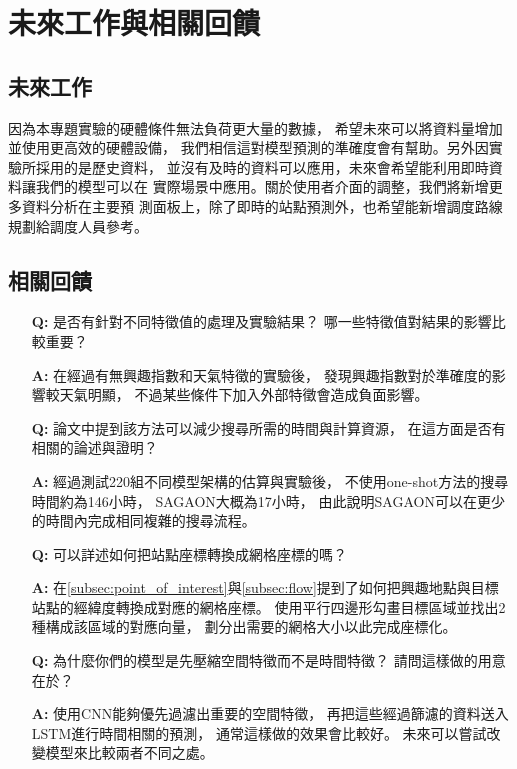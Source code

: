 \documentclass[a4paper,14pt]{extarticle}
\begin{document}
    \newpage
    \section{未來工作與相關回饋}
        \subsection{未來工作}
        因為本專題實驗的硬體條件無法負荷更大量的數據，
        希望未來可以將資料量增加並使用更高效的硬體設備，
        我們相信這對模型預測的準確度會有幫助。另外因實驗所採用的是歷史資料，
        並沒有及時的資料可以應用，未來會希望能利用即時資料讓我們的模型可以在
        實際場景中應用。關於使用者介面的調整，我們將新增更多資料分析在主要預
        測面板上，除了即時的站點預測外，也希望能新增調度路線規劃給調度人員參考。
        \subsection{相關回饋}
            \begin{itemize}
                \item [\textbf{Q:}]
                是否有針對不同特徵值的處理及實驗結果？
                哪一些特徵值對結果的影響比較重要？
                \item [\textbf{A:}]
                在經過有無興趣指數和天氣特徵的實驗後，
                發現興趣指數對於準確度的影響較天氣明顯，
                不過某些條件下加入外部特徵會造成負面影響。
                \item [\textbf{Q:}]
                論文中提到該方法可以減少搜尋所需的時間與計算資源，
                在這方面是否有相關的論述與證明？
                \item [\textbf{A:}]
                經過測試220組不同模型架構的估算與實驗後，
                不使用one-shot方法的搜尋時間約為146小時，
                SAGAON大概為17小時，
                由此說明SAGAON可以在更少的時間內完成相同複雜的搜尋流程。
                \item [\textbf{Q:}]
                可以詳述如何把站點座標轉換成網格座標的嗎？
                \item [\textbf{A:}]
                在\ref{subsec:point_of_interest}與\ref{subsec:flow}提到了如何把興趣地點與目標站點的經緯度轉換成對應的網格座標。
                使用平行四邊形勾畫目標區域並找出2種構成該區域的對應向量，
                劃分出需要的網格大小以此完成座標化。
                \item [\textbf{Q:}]
                為什麼你們的模型是先壓縮空間特徵而不是時間特徵？
                請問這樣做的用意在於？
                \item [\textbf{A:}]
                使用CNN能夠優先過濾出重要的空間特徵，
                再把這些經過篩濾的資料送入LSTM進行時間相關的預測，
                通常這樣做的效果會比較好。
                未來可以嘗試改變模型來比較兩者不同之處。
            \end{itemize}
\end{document}
